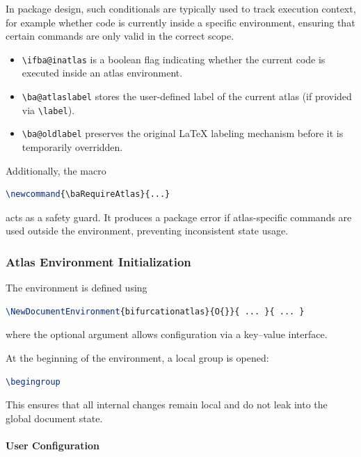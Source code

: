 In package design, such conditionals are typically used to track execution context, for example whether code is currently inside a specific environment, ensuring that certain commands are only valid in the correct scope.
\begin{itemize}
\item \lstinline|\ifba@inatlas| is a boolean flag indicating whether the current code is executed inside an atlas environment.
\item \lstinline|\ba@atlaslabel| stores the user-defined label of the current atlas (if provided via \lstinline|\label|).
\item \lstinline|\ba@oldlabel| preserves the original LaTeX labeling mechanism before it is temporarily overridden.
\end{itemize}
Additionally, the macro

\begin{lstlisting}[language=LaTeX]
\newcommand{\baRequireAtlas}{...}
\end{lstlisting}

acts as a safety guard. It produces a package error if atlas-specific commands are used outside the environment, preventing inconsistent state usage.

\subsubsection{Atlas Environment Initialization}

The environment is defined using

\begin{lstlisting}[language=LaTeX]
\NewDocumentEnvironment{bifurcationatlas}{O{}}{ ... }{ ... }
\end{lstlisting}

where the optional argument allows configuration via a key--value interface.

At the beginning of the environment, a local group is opened:

\begin{lstlisting}[language=LaTeX]
\begingroup
\end{lstlisting}

This ensures that all internal changes remain local and do not leak into the global document state.

\paragraph{User Configuration}

